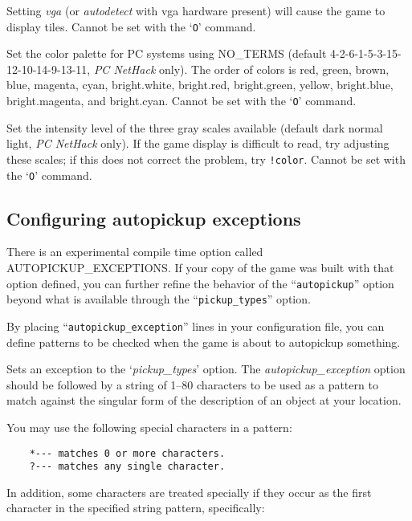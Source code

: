 Setting {\it vga\/} (or {\it autodetect\/} with vga hardware present) will cause
the game to display tiles. 
Cannot be set with the `{\tt O}' command.
\item[\ib{videocolors}]
\begin{sloppypar}
Set the color palette for PC systems using NO\_TERMS
(default 4-2-6-1-5-3-15-12-10-14-9-13-11, {\it PC\/ NetHack\/} only).
The order of colors is red, green, brown, blue, magenta, cyan,
bright.white, bright.red, bright.green, yellow, bright.blue,
bright.magenta, and bright.cyan.
Cannot be set with the `{\tt O}' command.
\end{sloppypar}
\item[\ib{videoshades}]
Set the intensity level of the three gray scales available
(default dark normal light, {\it PC\/ NetHack\/} only).
If the game display is difficult to read, try adjusting these scales;
if this does not correct the problem, try {\tt !color}.
Cannot be set with the `{\tt O}' command.
\elist

\subsection*{Configuring autopickup exceptions}

There is an experimental compile time option called AUTOPICKUP_EXCEPTIONS.  
If your copy of the game was built with that option defined, you can 
further refine the behavior of the ``{\tt autopickup}'' option beyond 
what is available through the ``{\tt pickup\_types}'' option.

By placing ``{\tt autopickup\_exception}'' lines in your configuration
file, you can define patterns to be checked when the game is about to
autopickup something.

\blist{}
\item[\ib{autopickup\_exception}]
Sets an exception to the `{\it pickup\_types}' option.
The {\it autopickup\_exception\/} option should be followed by a string of 1--80
characters to be used as a pattern to match against the singular form
of the description of an object at your location.

You may use the following special characters in a pattern:

\begin{verbatim}
    *--- matches 0 or more characters.
    ?--- matches any single character.
\end{verbatim}

In addition, some characters are treated specially if they occur as the first 
character in the specified string pattern, specifically:

